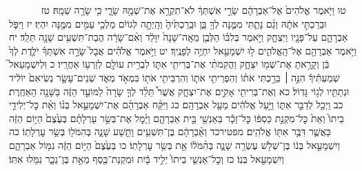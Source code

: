 \documentclass[twoside, openany, parskip=half, 11pt]{book}
\begin{document}
　　　 טו וַיֹּ֤אמֶר אֱלֹהִים֙ אֶל־אַבְרָהָ֔ם שָׂרַ֣י אִשְׁתְּךָ֔ לֹא־תִקְרָ֥א אֶת־שְׁמָ֖הּ שָׂרָ֑י כִּ֥י שָׂרָ֖ה שְׁמָֽהּ׃ טז וּבֵרַכְתִּ֣י אֹתָ֔הּ וְגַ֨ם נָתַ֧תִּי מִמֶּ֛נָּה לְךָ֖ בֵּ֑ן וּבֵֽרַכְתִּ֙יהָ֙ וְהָֽיְתָ֣ה לְגוֹיִ֔ם מַלְכֵ֥י עַמִּ֖ים מִמֶּ֥נָּה יִהְיֽוּ׃ יז וַיִּפֹּ֧ל אַבְרָהָ֛ם עַל־פָּנָ֖יו וַיִּצְחָ֑ק וַיֹּ֣אמֶר בְּלִבּ֗וֹ הַלְּבֶ֤ן מֵאָֽה־שָׁנָה֙ יִוָּלֵ֔ד וְאִ֨ם־שָׂרָ֔ה הֲבַת־תִּשְׁעִ֥ים שָׁנָ֖ה תֵּלֵֽד׃ יח וַיֹּ֥אמֶר אַבְרָהָ֖ם אֶל־הָֽאֱלֹהִ֑ים ל֥וּ יִשְׁמָעֵ֖אל יִחְיֶ֥ה לְפָנֶֽיךָ׃ יט וַיֹּ֣אמֶר אֱלֹהִ֗ים אֲבָל֙ שָׂרָ֣ה אִשְׁתְּךָ֗ יֹלֶ֤דֶת לְךָ֙ בֵּ֔ן וְקָרָ֥אתָ אֶת־שְׁמ֖וֹ יִצְחָ֑ק וַהֲקִמֹתִ֨י אֶת־בְּרִיתִ֥י אִתּ֛וֹ לִבְרִ֥ית עוֹלָ֖ם לְזַרְע֥וֹ אַחֲרָֽיו׃ כ וּֽלְיִשְׁמָעֵאל֮ שְׁמַעְתִּ֒יךָ֒ הִנֵּ֣ה ׀ בֵּרַ֣כְתִּי אֹת֗וֹ וְהִפְרֵיתִ֥י אֹת֛וֹ וְהִרְבֵּיתִ֥י אֹת֖וֹ בִּמְאֹ֣ד מְאֹ֑ד שְׁנֵים־עָשָׂ֤ר נְשִׂיאִם֙ יוֹלִ֔יד וּנְתַתִּ֖יו לְג֥וֹי גָּדֽוֹל׃ כא וְאֶת־בְּרִיתִ֖י אָקִ֣ים אֶת־יִצְחָ֑ק אֲשֶׁר֩ תֵּלֵ֨ד לְךָ֤ שָׂרָה֙ לַמּוֹעֵ֣ד הַזֶּ֔ה בַּשָּׁנָ֖ה הָאַחֶֽרֶת׃ כב וַיְכַ֖ל לְדַבֵּ֣ר אִתּ֑וֹ וַיַּ֣עַל אֱלֹהִ֔ים מֵעַ֖ל אַבְרָהָֽם׃ כג וַיִּקַּ֨ח אַבְרָהָ֜ם אֶת־יִשְׁמָעֵ֣אל בְּנ֗וֹ וְאֵ֨ת כׇּל־יְלִידֵ֤י בֵיתוֹ֙ וְאֵת֙ כׇּל־מִקְנַ֣ת כַּסְפּ֔וֹ כׇּל־זָכָ֕ר בְּאַנְשֵׁ֖י בֵּ֣ית אַבְרָהָ֑ם וַיָּ֜מׇל אֶת־בְּשַׂ֣ר עָרְלָתָ֗ם בְּעֶ֙צֶם֙ הַיּ֣וֹם הַזֶּ֔ה כַּאֲשֶׁ֛ר דִּבֶּ֥ר אִתּ֖וֹ אֱלֹהִֽים׃ מפטירכד וְאַ֨בְרָהָ֔ם בֶּן־תִּשְׁעִ֥ים וָתֵ֖שַׁע שָׁנָ֑ה בְּהִמֹּל֖וֹ בְּשַׂ֥ר עׇרְלָתֽוֹ׃ כה וְיִשְׁמָעֵ֣אל בְּנ֔וֹ בֶּן־שְׁלֹ֥שׁ עֶשְׂרֵ֖ה שָׁנָ֑ה בְּהִ֨מֹּל֔וֹ אֵ֖ת בְּשַׂ֥ר עׇרְלָתֽוֹ׃ כו בְּעֶ֙צֶם֙ הַיּ֣וֹם הַזֶּ֔ה נִמּ֖וֹל אַבְרָהָ֑ם וְיִשְׁמָעֵ֖אל בְּנֽוֹ׃ כז וְכׇל־אַנְשֵׁ֤י בֵיתוֹ֙ יְלִ֣יד בָּ֔יִת וּמִקְנַת־כֶּ֖סֶף מֵאֵ֣ת בֶּן־נֵכָ֑ר נִמֹּ֖לוּ אִתּֽוֹ׃
\end{document}
